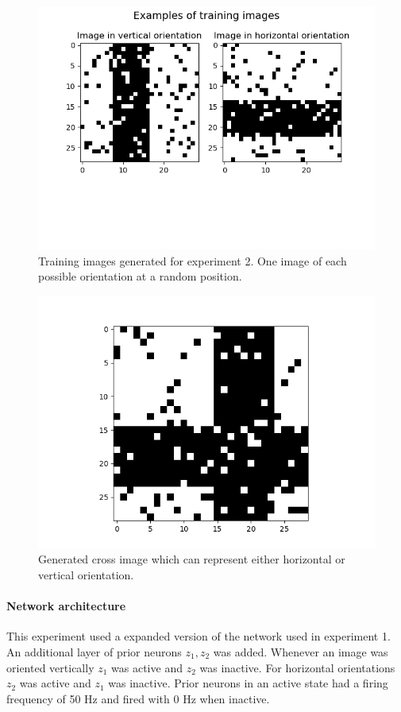 \begin{figure}
  \includegraphics[width=\linewidth]{figures/horvert/horvertTrainingImages.png}
  \caption{Training images generated for experiment 2. One image of each possible orientation at a random position.}
  \label{fig:horvertImages}
\end{figure}

\begin{figure}
  \includegraphics[width=0.6\linewidth]{figures/horvert/horvertTrainingCrossImage.png}
  \caption{Generated cross image which can represent either horizontal or vertical orientation.}
  \label{fig:horvertTrainingCrossImage}
\end{figure}


\paragraph{Network architecture}

This experiment used a expanded version of the network used in experiment 1. An additional layer of prior neurons $z_1,z_2$ was added. Whenever an image was oriented vertically $z_1$ was active and $z_2$ was inactive. For horizontal orientations $z_2$ was active and $z_1$ was inactive. Prior neurons in an active state had a firing frequency of 50 Hz and fired with 0 Hz when inactive.

